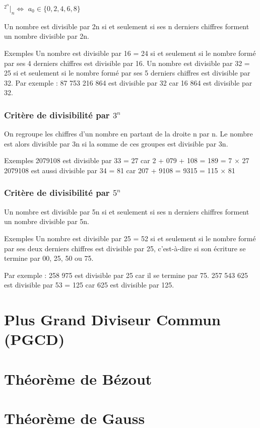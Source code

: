 \documentclass[a4paper]{article}
\begin{document}
$^{2^{\alpha}}|_n \Leftrightarrow$ $a_0 \in \{ 0,2,4,6,8 \}$

	Un nombre est divisible par 2n si et seulement si ses n derniers chiffres forment un nombre divisible par 2n.

Exemples
	Un nombre est divisible par 16 = 24 si et seulement si le nombre formé par ses 4 derniers chiffres est divisible par 16.
	Un nombre est divisible par 32 = 25 si et seulement si le nombre formé par ses 5 derniers chiffres est divisible par 32. 
Par exemple : 87 753 216 864 est divisible par 32 car 16 864 est divisible par 32.


\subsubsection*{Critère de divisibilité par $3^n$}

	On regroupe les chiffres d'un nombre en partant de la droite n par n.
	Le nombre est alors divisible par 3n si la somme de ces groupes est divisible par 3n.

Exemples
	2079108 est divisible par 33 = 27 car  		2 + 079 + 108 = 189 	= 7 × 27
	2079108 est aussi divisible par 34 = 81 car		207 + 9108 = 9315 	= 115 × 81








\subsubsection*{Critère de divisibilité par $5^n$}

	Un nombre est divisible par 5n si et seulement si ses n derniers chiffres forment un nombre divisible par 5n.


Exemples
	Un nombre est divisible par 25 = 52 si et seulement si le nombre formé par ses deux derniers chiffres est divisible par 25, c'est-à-dire si son écriture se termine par 00, 25, 50 ou 75.

Par exemple : 258 975 est divisible par 25 car il se termine par 75.
		 257 543 625 est divisible par 53 = 125 car 625 est divisible par 125.


\pagebreak

\section{Plus Grand Diviseur Commun (PGCD)}

\pagebreak

\section{Théorème de Bézout}

\pagebreak

\section{Théorème de Gauss}

\pagebreak
\end{document}
